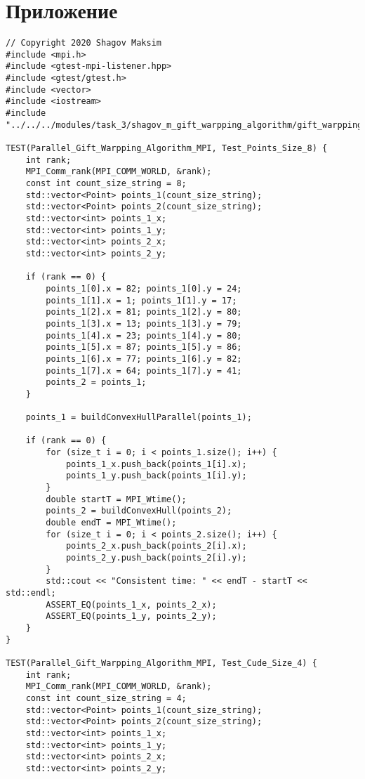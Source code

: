 \documentclass{report}
\begin{document}
\section*{Приложение}
\begin{lstlisting}
// Copyright 2020 Shagov Maksim
#include <mpi.h>
#include <gtest-mpi-listener.hpp>
#include <gtest/gtest.h>
#include <vector>
#include <iostream>
#include "../../../modules/task_3/shagov_m_gift_warpping_algorithm/gift_warpping_algorithm.h"

TEST(Parallel_Gift_Warpping_Algorithm_MPI, Test_Points_Size_8) {
    int rank;
    MPI_Comm_rank(MPI_COMM_WORLD, &rank);
    const int count_size_string = 8;
    std::vector<Point> points_1(count_size_string);
    std::vector<Point> points_2(count_size_string);
    std::vector<int> points_1_x;
    std::vector<int> points_1_y;
    std::vector<int> points_2_x;
    std::vector<int> points_2_y;

    if (rank == 0) {
        points_1[0].x = 82; points_1[0].y = 24;
        points_1[1].x = 1; points_1[1].y = 17;
        points_1[2].x = 81; points_1[2].y = 80;
        points_1[3].x = 13; points_1[3].y = 79;
        points_1[4].x = 23; points_1[4].y = 80;
        points_1[5].x = 87; points_1[5].y = 86;
        points_1[6].x = 77; points_1[6].y = 82;
        points_1[7].x = 64; points_1[7].y = 41;
        points_2 = points_1;
    }

    points_1 = buildConvexHullParallel(points_1);

    if (rank == 0) {
        for (size_t i = 0; i < points_1.size(); i++) {
            points_1_x.push_back(points_1[i].x);
            points_1_y.push_back(points_1[i].y);
        }
        double startT = MPI_Wtime();
        points_2 = buildConvexHull(points_2);
        double endT = MPI_Wtime();
        for (size_t i = 0; i < points_2.size(); i++) {
            points_2_x.push_back(points_2[i].x);
            points_2_y.push_back(points_2[i].y);
        }
        std::cout << "Consistent time: " << endT - startT << std::endl;
        ASSERT_EQ(points_1_x, points_2_x);
        ASSERT_EQ(points_1_y, points_2_y);
    }
}

TEST(Parallel_Gift_Warpping_Algorithm_MPI, Test_Cude_Size_4) {
    int rank;
    MPI_Comm_rank(MPI_COMM_WORLD, &rank);
    const int count_size_string = 4;
    std::vector<Point> points_1(count_size_string);
    std::vector<Point> points_2(count_size_string);
    std::vector<int> points_1_x;
    std::vector<int> points_1_y;
    std::vector<int> points_2_x;
    std::vector<int> points_2_y;


\end{lstlisting}
\end{document}
